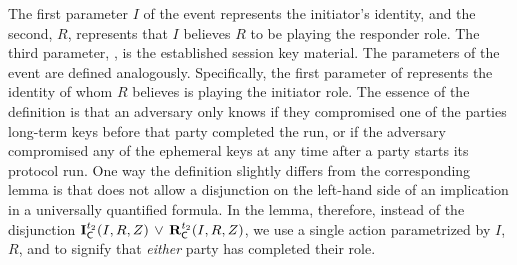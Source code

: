 %
The first parameter $I$ of the \mIComplete{} event represents the
initiator's identity,
and the second, $R$, represents that $I$ believes $R$ to be playing
the responder role.
%
The third parameter, \mSessKey{}, is the established session key material.
%
The parameters of the \mRComplete{} event are defined analogously.
%
Specifically, the first parameter of \mRComplete{} represents the identity of
whom $R$ believes is playing the initiator role.
%
%
The essence of the definition is that an adversary only knows \mSessKey{} if they
compromised one of the
parties long-term keys before that party completed the run, or if the adversary
compromised any of the ephemeral keys at any time after a party starts
its protocol run.
%
One way the definition slightly differs from the corresponding \mTamarin{} lemma
is that \mTamarin{} does not allow a disjunction on the left-hand side of an
implication in a universally quantified formula.
%
In the lemma, therefore, instead of the disjunction
$\mathbf{I}_{\textsf{C}}^{t_2}(I, R, Z)\, \lor\,  \mathbf{R}_{\textsf{C}}^{t_2}(I, R, Z)$,
we use a single action parametrized by $I$, $R$, and \mSessKey{} to signify that
\emph{either} party has completed their role.
%
